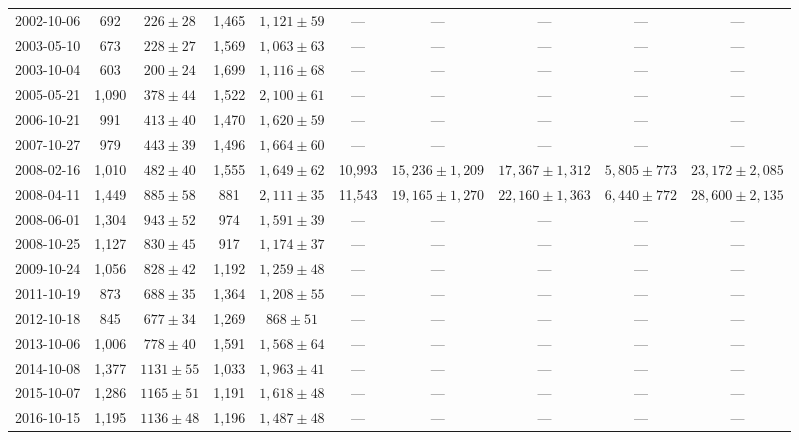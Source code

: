\begin{landscape}
\begin{longtable}{cccccccccc}
{2002-10-06} & 692 & {$226  \pm  28$} & 1,465 & {$1,121 \pm 59$} & --- & --- & --- & --- & --- \\
{2003-05-10} & 673 & {$228  \pm  27$} & 1,569 & {$1,063 \pm 63$} & --- & --- & --- & --- & --- \\
{2003-10-04} & 603 & {$200  \pm  24$} & 1,699 & {$1,116 \pm 68$} & --- & --- & --- & --- & --- \\
{2005-05-21} & 1,090 & {$378  \pm  44$} & 1,522 & {$2,100 \pm 61$} & --- & --- & --- & --- & --- \\
{2006-10-21} & 991 & {$413  \pm  40$} & 1,470 & {$1,620 \pm 59$} & --- & --- & --- & --- & --- \\
{2007-10-27} & 979 & {$443  \pm  39$} & 1,496 & {$1,664 \pm 60$} & --- & --- & --- & --- & --- \\
{2008-02-16} & 1,010 & {$482  \pm  40$} & 1,555 & {$1,649 \pm 62$} & 10,993 & {$15,236 \pm 1,209$} & {$17,367 \pm 1,312$} & {$5,805 \pm 773$} & {$23,172 \pm 2,085$} \\
{2008-04-11} & 1,449 & {$885  \pm  58$} & 881 & {$2,111 \pm 35$} & 11,543 & {$19,165 \pm 1,270$} & {$22,160 \pm 1,363$} & {$6,440 \pm 772$} & {$28,600 \pm 2,135$} \\
{2008-06-01} & 1,304 & {$943  \pm  52$} & 974 & {$1,591 \pm 39$} & --- & --- & --- & --- & --- \\
{2008-10-25} & 1,127 & {$830  \pm  45$} & 917 & {$1,174 \pm 37$} & --- & --- & --- & --- & --- \\
{2009-10-24} & 1,056 & {$828  \pm  42$} & 1,192 & {$1,259 \pm 48$} & --- & --- & --- & --- & --- \\
{2011-10-19} & 873 & {$688  \pm  35$} & 1,364 & {$1,208 \pm 55$} & --- & --- & --- & --- & --- \\
{2012-10-18} & 845 & {$677  \pm  34$} & 1,269 & {$868 \pm 51$} & --- & --- & --- & --- & --- \\
{2013-10-06} & 1,006 & {$778  \pm  40$} & 1,591 & {$1,568 \pm 64$} & --- & --- & --- & --- & --- \\
{2014-10-08} & 1,377 & {$1131  \pm  55$} & 1,033 & {$1,963 \pm 41$} & --- & --- & --- & --- & --- \\
{2015-10-07} & 1,286 & {$1165  \pm  51$} & 1,191 & {$1,618 \pm 48$} & --- & --- & --- & --- & --- \\
{2016-10-15} & 1,195 & {$1136  \pm  48$} & 1,196 & {$1,487 \pm 48$} & --- & --- & --- & --- & --- \\
\end{longtable} 
\end{landscape} 
